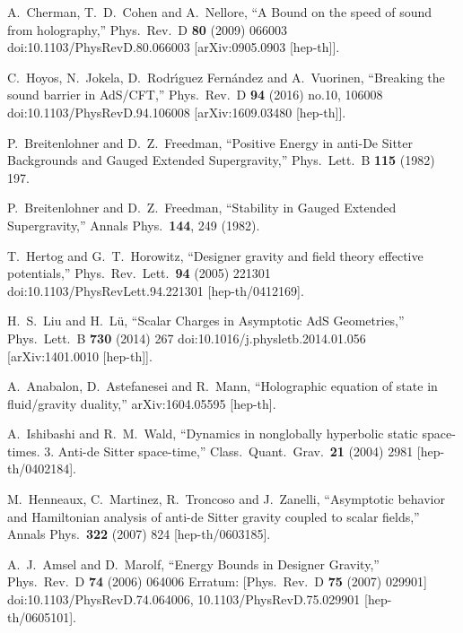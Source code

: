\documentclass[11pt,epsf,letterpaper]{article}%
\begin{document}
\begin{thebibliography}{99}
A.~Cherman, T.~D.~Cohen and A.~Nellore, ``A Bound on
the speed of sound from holography,'' Phys.\ Rev.\ D \textbf{80} (2009) 066003
doi:10.1103/PhysRevD.80.066003 [arXiv:0905.0903 [hep-th]].

C.~Hoyos, N.~Jokela, D.~Rodr\'{\i}guez Fern\'{a}ndez
and A.~Vuorinen, ``Breaking the sound barrier in AdS/CFT,'' Phys.\ Rev.\ D
\textbf{94} (2016) no.10, 106008 doi:10.1103/PhysRevD.94.106008
[arXiv:1609.03480 [hep-th]].


P.~Breitenlohner and D.~Z.~Freedman, ``Positive
Energy in anti-De Sitter Backgrounds and Gauged Extended Supergravity,''
Phys.\ Lett.\ B \textbf{115} (1982) 197.


P.~Breitenlohner and D.~Z.~Freedman, ``Stability in Gauged
Extended Supergravity,'' Annals Phys.\ \textbf{144}, 249 (1982).


T.~Hertog and G.~T.~Horowitz, ``Designer gravity and
field theory effective potentials,'' Phys.\ Rev.\ Lett.\ \textbf{94} (2005)
221301 doi:10.1103/PhysRevLett.94.221301 [hep-th/0412169].

H.~S.~Liu and H.~L\"{u}, ``Scalar Charges in Asymptotic
AdS Geometries,'' Phys.\ Lett.\ B \textbf{730} (2014) 267
doi:10.1016/j.physletb.2014.01.056 [arXiv:1401.0010 [hep-th]].

A.~Anabalon, D.~Astefanesei and R.~Mann,
``Holographic equation of state in fluid/gravity duality,'' arXiv:1604.05595 [hep-th].

A.~Ishibashi and R.~M.~Wald, ``Dynamics in
nonglobally hyperbolic static space-times. 3. Anti-de Sitter space-time,''
Class.\ Quant.\ Grav.\ \textbf{21} (2004) 2981 [hep-th/0402184].


M.~Henneaux, C.~Martinez, R.~Troncoso and
J.~Zanelli, ``Asymptotic behavior and Hamiltonian analysis of anti-de Sitter
gravity coupled to scalar fields,'' Annals Phys.\ \textbf{322} (2007) 824 [hep-th/0603185].

A.~J.~Amsel and D.~Marolf, ``Energy Bounds in Designer
Gravity,'' Phys.\ Rev.\ D \textbf{74} (2006) 064006 Erratum: [Phys.\ Rev.\ D
\textbf{75} (2007) 029901] doi:10.1103/PhysRevD.74.064006,
10.1103/PhysRevD.75.029901 [hep-th/0605101].


\end{thebibliography}
\end{document}
